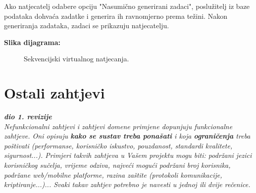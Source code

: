 					Ako natjecatelj odabere opciju "Nasumično generirani zadaci", poslužitelj iz baze podataka dohvaća zadatke i generira ih ravnomjerno prema težini. Nakon generiranja zadataka, zadaci se prikazuju natjecatelju.
					
					\textbf{Slika dijagrama:}
					\begin{figure}[H]
					\centering
					
					\caption{Sekvencijski virtualnog natjecanja.}
					\end{figure}
			
					
				
				
	
		\section{Ostali zahtjevi}
		
			\textbf{\textit{dio 1. revizije}}\\
		 
			 \textit{Nefunkcionalni zahtjevi i zahtjevi domene primjene dopunjuju funkcionalne zahtjeve. Oni opisuju \textbf{kako se sustav treba ponašati} i koja \textbf{ograničenja} treba poštivati (performanse, korisničko iskustvo, pouzdanost, standardi kvalitete, sigurnost...). Primjeri takvih zahtjeva u Vašem projektu mogu biti: podržani jezici korisničkog sučelja, vrijeme odziva, najveći mogući podržani broj korisnika, podržane web/mobilne platforme, razina zaštite (protokoli komunikacije, kriptiranje...)... Svaki takav zahtjev potrebno je navesti u jednoj ili dvije rečenice.}
			 
			 
			 
	